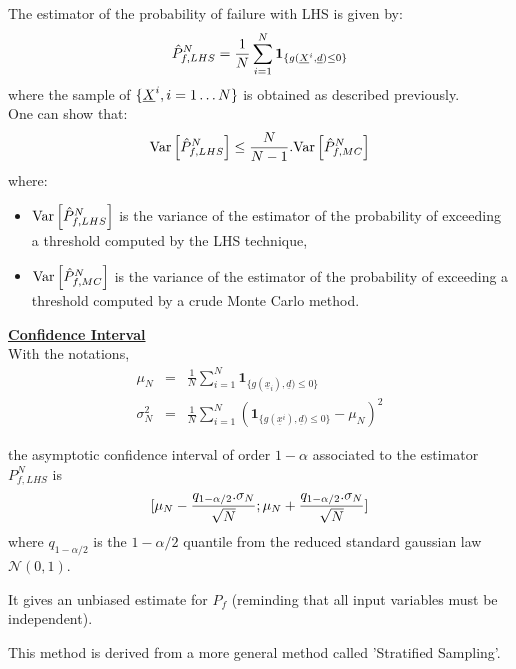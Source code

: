 {The estimator of the probability of failure with LHS is given by:
$$
\hat{P}_{f,LHS}^N = \frac{1}{N}\sum_{i=1}^N \mathbf{1}_{\{g(\underline{X}^i,\underline{d}) \leq 0 \}}
$$
where the sample of $ \{ \underline{X}^i,i=1 \hdots N \}$ is obtained as described previously.\\
One can show that:
$$
{\rm Var}\left[ \hat{P}_{f,LHS}^N \right] \leq \frac{N}{N-1} . {\rm Var}\left[ 	\hat{P}_{f,MC}^N \right]
$$
where:
\begin{itemize}
\item	${\rm Var}\left[ \hat{P}_{f,LHS}^N \right]$ is the variance of the estimator of the probability of exceeding a threshold computed by the LHS technique,
\item	${\rm Var}\left[ \hat{P}_{f,MC}^N \right]$ is the variance of the estimator of the probability of exceeding a threshold computed by a crude Monte Carlo method.
\end{itemize}


\underline{\textbf{Confidence Interval}}\\
With the notations,
\begin{eqnarray*}
\mu_N &=& \frac{1}{N}\sum_{i=1}^N \mathbf{1}_{\{g(\underline{x}_i),\underline{d}) \leq 0 \}}\\
\sigma_N^2 &=& \frac{1}{N}\sum_{i=1}^N (\mathbf{1}_{\{g(\underline{x}^i),\underline{d}) \leq 0 \}} - \mu_N)^2
\end{eqnarray*}

the asymptotic confidence interval of order $1-\alpha$ associated to the estimator $P_{f,LHS}^N$ is 
$$
[ \mu_N - \frac{q_{1-\alpha / 2} . \sigma_N}{\sqrt{N}} \space ; \space \mu_N + \frac{q_{1-\alpha / 2} . \sigma_N}{\sqrt{N}} ]
$$
where $q_{1-\alpha /2}$ is the $1-\alpha / 2$ quantile from the reduced standard gaussian law $\mathcal N(0,1)$.

It gives an unbiased estimate for $P_f$ (reminding that all input variables must be independent).

}
{
This method is derived from a more general method called 'Stratified Sampling'.
}

